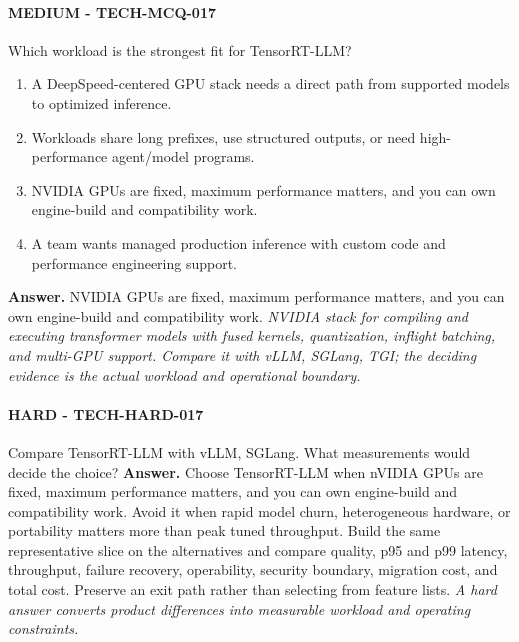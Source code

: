 \paragraph{MEDIUM - TECH-MCQ-017} Which workload is the strongest fit for TensorRT-LLM?
\begin{enumerate}[label=\Alph*.]
\item A DeepSpeed-centered GPU stack needs a direct path from supported models to optimized inference.
\item Workloads share long prefixes, use structured outputs, or need high-performance agent/model programs.
\item NVIDIA GPUs are fixed, maximum performance matters, and you can own engine-build and compatibility work.
\item A team wants managed production inference with custom code and performance engineering support.
\end{enumerate}
\textbf{Answer.} NVIDIA GPUs are fixed, maximum performance matters, and you can own engine-build and compatibility work.
\textit{NVIDIA stack for compiling and executing transformer models with fused kernels, quantization, inflight batching, and multi-GPU support. Compare it with vLLM, SGLang, TGI; the deciding evidence is the actual workload and operational boundary.}
\paragraph{HARD - TECH-HARD-017} Compare TensorRT-LLM with vLLM, SGLang. What measurements would decide the choice?
\textbf{Answer.} Choose TensorRT-LLM when nVIDIA GPUs are fixed, maximum performance matters, and you can own engine-build and compatibility work. Avoid it when rapid model churn, heterogeneous hardware, or portability matters more than peak tuned throughput. Build the same representative slice on the alternatives and compare quality, p95 and p99 latency, throughput, failure recovery, operability, security boundary, migration cost, and total cost. Preserve an exit path rather than selecting from feature lists.
\textit{A hard answer converts product differences into measurable workload and operating constraints.}
